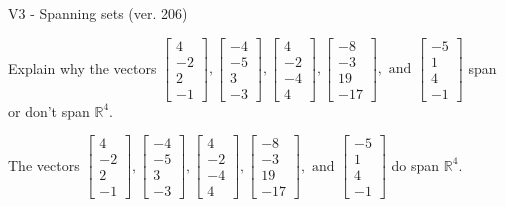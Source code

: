 \begin{exercise}
  \begin{exerciseTitle}V3 - Spanning sets (ver. 206)\end{exerciseTitle}
  \begin{exerciseStatement}
    Explain why the vectors \(\left[\begin{array}{r}
4 \\
-2 \\
2 \\
-1
\end{array}\right] , \left[\begin{array}{r}
-4 \\
-5 \\
3 \\
-3
\end{array}\right] , \left[\begin{array}{r}
4 \\
-2 \\
-4 \\
4
\end{array}\right] , \left[\begin{array}{r}
-8 \\
-3 \\
19 \\
-17
\end{array}\right] , \text{ and } \left[\begin{array}{r}
-5 \\
1 \\
4 \\
-1
\end{array}\right]\) span or don't span \(\mathbb{R}^4\). 
	


  \end{exerciseStatement}
  \begin{exerciseAnswer}
   The vectors \(\left[\begin{array}{r}
4 \\
-2 \\
2 \\
-1
\end{array}\right] , \left[\begin{array}{r}
-4 \\
-5 \\
3 \\
-3
\end{array}\right] , \left[\begin{array}{r}
4 \\
-2 \\
-4 \\
4
\end{array}\right] , \left[\begin{array}{r}
-8 \\
-3 \\
19 \\
-17
\end{array}\right] , \text{ and } \left[\begin{array}{r}
-5 \\
1 \\
4 \\
-1
\end{array}\right]\) 
  	 do  
	span \(\mathbb{R}^4\).
  



\end{exerciseAnswer}
\end{exercise}

